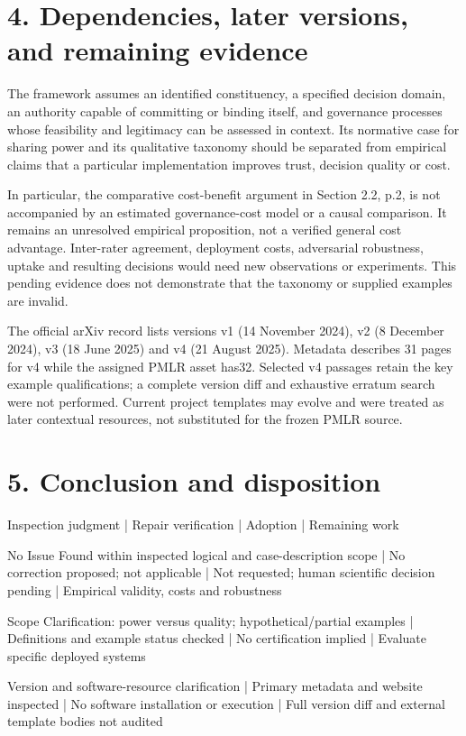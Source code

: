 \documentclass[10pt]{article}
\begin{document}
\section*{4. Dependencies, later versions, and remaining evidence}
The framework assumes an identified constituency, a specified decision domain, an authority capable of committing or binding itself, and governance processes whose feasibility and legitimacy can be assessed in context. Its normative case for sharing power and its qualitative taxonomy should be separated from empirical claims that a particular implementation improves trust, decision quality or cost.\par
In particular, the comparative cost-benefit argument in Section 2.2, p.2, is not accompanied by an estimated governance-cost model or a causal comparison. It remains an unresolved empirical proposition, not a verified general cost advantage. Inter-rater agreement, deployment costs, adversarial robustness, uptake and resulting decisions would need new observations or experiments. This pending evidence does not demonstrate that the taxonomy or supplied examples are invalid.\par
The official arXiv record lists versions v1 (14 November 2024), v2 (8 December 2024), v3 (18 June 2025) and v4 (21 August 2025). Metadata describes 31 pages for v4 while the assigned PMLR asset has32. Selected v4 passages retain the key example qualifications; a complete version diff and exhaustive erratum search were not performed. Current project templates may evolve and were treated as later contextual resources, not substituted for the frozen PMLR source.\par
\section*{5. Conclusion and disposition}
Inspection judgment | Repair verification | Adoption | Remaining work\par
No Issue Found within inspected logical and case-description scope | No correction proposed; not applicable | Not requested; human scientific decision pending | Empirical validity, costs and robustness\par
Scope Clarification: power versus quality; hypothetical/partial examples | Definitions and example status checked | No certification implied | Evaluate specific deployed systems\par
Version and software-resource clarification | Primary metadata and website inspected | No software installation or execution | Full version diff and external template bodies not audited\par
\end{document}
